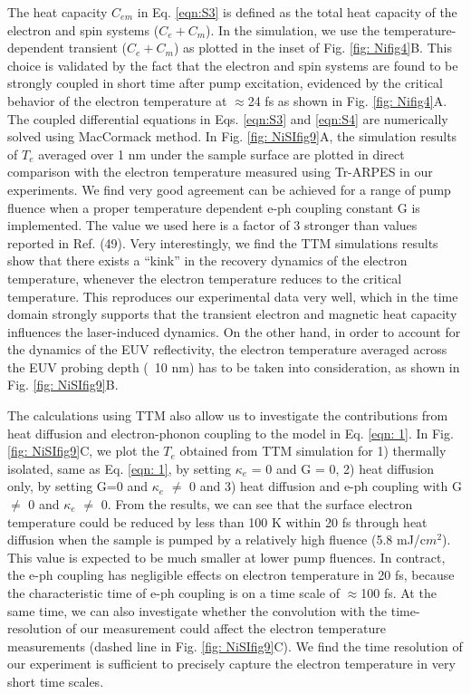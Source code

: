 The heat capacity $C_{em}$ in Eq. \ref{eqn:S3} is defined as the total heat capacity of the electron and spin systems ($C_e+C_m$). In the simulation, we use the temperature-dependent transient ($C_e+C_m$) as plotted in the inset of Fig. \ref{fig: Nifig4}B. This choice is validated by the fact that the electron and spin systems are found to be strongly coupled in short time after pump excitation, evidenced by the critical behavior of the electron temperature at $\approx$24 fs as shown in Fig. \ref{fig: Nifig4}A. The coupled differential equations in Eqs. \ref{eqn:S3} and \ref{eqn:S4} are numerically solved using MacCormack method. In Fig. \ref{fig: NiSIfig9}A, the simulation results of $T_e$ averaged over 1 nm under the sample surface are plotted in direct comparison with the electron temperature measured using Tr-ARPES in our experiments. We find very good agreement can be achieved for a range of pump fluence when a proper temperature dependent e-ph coupling constant G is implemented. The value we used here is a factor of 3 stronger than values reported in Ref. (49).  Very interestingly, we find the TTM simulations results show that there exists a “kink” in the recovery dynamics of the electron temperature, whenever the electron temperature reduces to the critical temperature. This reproduces our experimental data very well, which in the time domain strongly supports that the transient electron and magnetic heat capacity influences the laser-induced dynamics. On the other hand, in order to account for the dynamics of the EUV reflectivity, the electron temperature averaged across the EUV probing depth (~10 nm) has to be taken into consideration, as shown in Fig. \ref{fig: NiSIfig9}B.

The calculations using TTM also allow us to investigate the contributions from heat diffusion and electron-phonon coupling to the model in Eq. \ref{eqn: 1}. In Fig. \ref{fig: NiSIfig9}C, we plot the $T_e$ obtained from TTM simulation for 1) thermally isolated, same as Eq. \ref{eqn: 1}, by setting $\kappa_e$ = 0 and G = 0, 2) heat diffusion only, by setting G=0 and $\kappa_e$ $\neq$ 0 and 3) heat diffusion and e-ph coupling with G $\neq$ 0 and $\kappa_e$ $\neq$ 0. From the results, we can see that the surface electron temperature could be reduced by less than 100 K within 20 fs through heat diffusion when the sample is pumped by a relatively high fluence (5.8 mJ/c$m^2$). This value is expected to be much smaller at lower pump fluences. In contract, the e-ph coupling has negligible effects on electron temperature in 20 fs, because the characteristic time of e-ph coupling is on a time scale of $\approx$100 fs. At the same time, we can also investigate whether the convolution with the time-resolution of our measurement could affect the electron temperature measurements (dashed line in Fig. \ref{fig: NiSIfig9}C). We find the time resolution of our experiment is sufficient to precisely capture the electron temperature in very short time scales.

